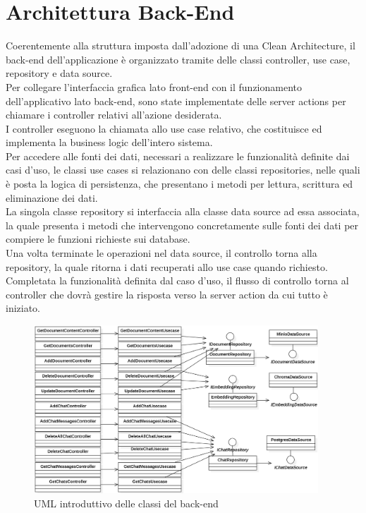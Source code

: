 \section{Architettura Back-End} \label{sec:archback}

Coerentemente alla struttura imposta dall'adozione di una Clean Architecture, il back-end dell'applicazione è organizzato tramite delle classi controller, use case, repository e data source.\\
Per collegare l'interfaccia grafica lato front-end con il funzionamento dell'applicativo lato back-end, sono state implementate delle server actions per chiamare i controller relativi all'azione desiderata.\\
I controller eseguono la chiamata allo use case relativo, che costituisce ed implementa la business logic dell'intero sistema.\\
Per accedere alle fonti dei dati, necessari a realizzare le funzionalità definite dai casi d'uso, le classi use cases si relazionano con delle classi repositories, nelle quali è posta la logica di persistenza, che presentano i metodi per lettura, scrittura ed eliminazione dei dati.\\
La singola classe repository si interfaccia alla classe data source ad essa associata, la quale presenta i metodi che intervengono concretamente sulle fonti dei dati per compiere le funzioni richieste sui database.\\
Una volta terminate le operazioni nel data source, il controllo torna alla repository, la quale ritorna i dati recuperati allo use case quando richiesto. Completata la funzionalità definita dal caso d'uso, il flusso di controllo torna al controller che dovrà gestire la risposta verso la server action da cui tutto è iniziato.

\begin{figure}[h!]
    \centering  
    \includegraphics[width=0.95\textwidth]{backendview.png}
    \caption{UML introduttivo delle classi del back-end}
\end{figure}


